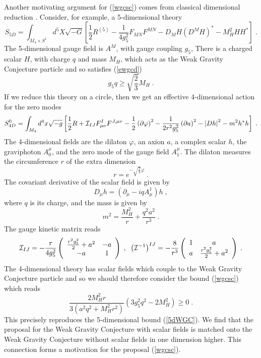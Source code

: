 \documentclass[11pt,a4paper]{article}
\numberwithin{equation}{section}
\numberwithin{table}{section}\setlength{\multlinegap}{25pt}
\newcommand{\be}{\begin{equation}}
\newcommand{\ee}{\end{equation}}
\begin{document}
Another motivating argument for (\ref{wgcsc}) comes from classical dimensional reduction \cite{Lust:2017wrl}. Consider, for example, a 5-dimensional theory 
\be
S_{5D} = \int_{M_4 \times S^1} d^5 X \sqrt{-G} \left[ \frac12 R^{(5)}  - \frac{1}{4g_5^2} F_{MN} F^{MN} - D_M H \left(D^M H \right)^* - M_H^2 H H^* \right] \;. \label{5daction}
\ee
The 5-dimensional gauge field is $A^M$, with gauge coupling $g_5$, There is a charged scalar $H$, with charge $q$ and mass $M_H$, which acts as the Weak Gravity Conjecture particle and so satisfies (\ref{ewgcd}) 
\be
g_5 q \geq \sqrt{\frac23}  M_H \;. \label{5dWGC}
\ee
If we reduce this theory on a circle, then we get an effective 4-dimensional action for the zero modes 
\be
S^0_{4D} = \int_{M_4} d^4 x \sqrt{-g} \left[ \frac12 R + {\cal I}_{IJ}  F_{\mu\nu}^{I}  F^{J,\mu\nu}  - \frac12 \left(\partial \varphi \right)^2 - \frac{1}{2 r^2g_5^2} \left(\partial a \right)^2 - \left| D h \right|^2 - m^2 h^* h\right] \;. \label{4dreducedaction}
\ee
The 4-dimensional fields are the dilaton $\varphi$, an axion $a$, a complex scalar $h$, the graviphoton $A_0^{\mu}$, and the zero mode of the gauge field $A_1^{\mu}$. The dilaton measures the circumference $r$ of the extra dimension
\be
r = e^{-\sqrt{\frac{2}{3}}\varphi} \;.
\ee 
The covariant derivative of the scalar field is given by
\be
D_{\mu} h = \left(\partial_{\mu} - i q A^1_{\mu} \right) h \;,
\ee
where $q$ is its charge, and the mass is given by
\be
m^2 =  \frac{M_H^2}{r} +\frac{q^2 a^2}{r^3} \;.
\ee
The gauge kinetic matrix reads
\be
{\cal I}_{IJ} = -\frac{r}{4 g_5^2} \left( \begin{array}{cc} \frac{r^2g_5^2}{2} + a^2 & -a \\ -a & 1 \end{array} \right) \;,\;\; \left({\cal I}^{-1}\right)^{IJ} = -\frac{8}{r^3} \left( \begin{array}{cc}  1 & a \\ a & \frac{r^2g_5^2}{2} + a^2 \end{array} \right)\;. 
\ee
The 4-dimensional theory has scalar fields which couple to the Weak Gravity Conjecture particle and so we should therefore consider the bound (\ref{wgcsc}) which reads
\be
\frac{2M_H^2 r}{3\left(a^2 q^2 + M_H^2 r^2 \right)}\left(3 g_5^2 q^2 - 2 M_H^2  \right) \geq 0 \;. \label{4dbo}
\ee
This precisely reproduces the 5-dimensional bound (\ref{5dWGC}). We find that the proposal for the Weak Gravity Conjecture with scalar fields is matched onto the Weak Gravity Conjecture without scalar fields in one dimension higher. This connection forms a motivation for the proposal (\ref{wgcsc}).
\end{document}
